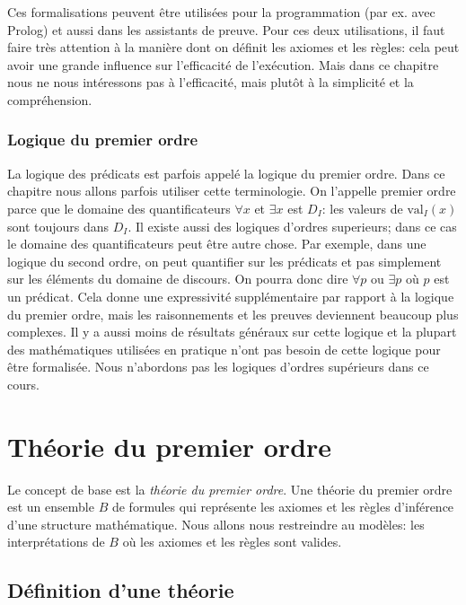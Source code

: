 {Ces formalisations peuvent être utilisées pour la programmation (par ex. avec Prolog)
et aussi dans les assistants de preuve.
Pour ces deux utilisations, il faut faire très attention à la manière dont on définit
les axiomes et les règles: cela peut avoir une grande influence sur l'efficacité de
l'exécution.
Mais dans ce chapitre nous ne nous intéressons pas à l'efficacité, mais plutôt à
la simplicité et la compréhension.

\subsubsection{Logique du premier ordre}

La logique des prédicats est parfois appelé la logique du premier ordre.
Dans ce chapitre nous allons parfois utiliser cette terminologie.
On l'appelle premier ordre parce que le domaine des quantificateurs $\forall x$ et $\exists x$
est $D_I$: les valeurs de $\mathrm{val}_I(x)$ sont toujours dans $D_I$.
Il existe aussi des logiques d'ordres superieurs; dans ce cas le domaine des quantificateurs
peut être autre chose.
Par exemple, dans une logique du second ordre, on peut quantifier sur les prédicats et pas
simplement sur les éléments du domaine de discours.
On pourra donc dire $\forall p$ ou $\exists p$ où $p$ est un prédicat.
Cela donne une expressivité supplémentaire par rapport à la logique du premier ordre,
mais les raisonnements et les preuves deviennent beaucoup plus complexes.
Il y a aussi moins de résultats généraux sur cette logique
et la plupart des mathématiques utilisées en pratique n'ont pas besoin de cette logique
pour être formalisée.
Nous n'abordons pas les logiques d'ordres supérieurs dans ce cours.

\section{Théorie du premier ordre}

Le concept de base est la {\em théorie du premier ordre}.
Une théorie du premier ordre est un ensemble $B$ de formules
qui représente les axiomes et les règles d'inférence d'une structure mathématique.
Nous allons nous restreindre au modèles: les interprétations de $B$
où les axiomes et les règles sont valides.

\subsection{Définition d'une théorie}

}
